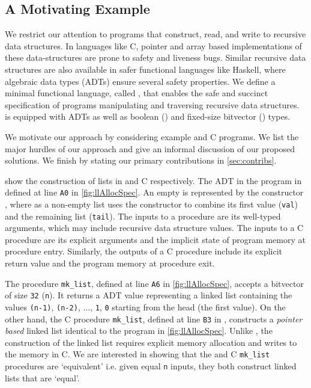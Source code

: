 \subsection{A Motivating Example}
\label{sec:motivatingexample}
We restrict our attention to programs that construct, read, and write
to recursive data structures. In languages like C, pointer and array based
implementations of these data-structures are prone to safety and liveness bugs.
Similar recursive data structures are also available in safer functional languages like Haskell,
where algebraic data types (ADTs) \cite{hope} ensure several safety properties.
We define a minimal functional language, called \SpecL{}, that enables the safe
and succinct specification of programs manipulating and traversing recursive data structures.
\SpecL{} is equipped with ADTs as well as boolean () and fixed-size bitvector () types.

We motivate our approach by considering example \SpecL{} and C programs.
We list the major hurdles of our approach and give an informal discussion of our proposed solutions.
We finish by stating our primary contributions in \cref{sec:contribs}.





 show the construction of lists in \SpecL{} and C respectively.
The  ADT in the \SpecL{} program in defined at line {\tt A0} in \cref{fig:llAllocSpec}.
An empty  is represented by the constructor , where as a non-empty list uses
the  constructor to combine its first value ({\tt val}) and
the remaining list ({\tt tail}).
The inputs to a \SpecL{} procedure are its well-typed arguments, which may include recursive data structure values.
The inputs to a C procedure are its explicit arguments and the implicit state of program memory at procedure entry.
Similarly, the outputs of a C procedure include its explicit return value and the program memory at procedure exit.

The \SpecL{} procedure {\tt mk\_list}, defined at line {\tt A6} in \cref{fig:llAllocSpec}, accepts
a bitvector of size {\tt 32} ({\tt n}).
It returns a  ADT value representing a linked list containing
the values {\tt (n-1)}, {\tt (n-2)}, ..., {\tt 1}, {\tt 0} starting from the head (the first value).
On the other hand, the C procedure {\tt mk\_list}, defined at line {\tt B3} in ,
constructs a {\em pointer based} linked list identical to the \SpecL{} program in \cref{fig:llAllocSpec}.
Unlike \SpecL{}, the construction of the linked list requires explicit memory allocation and writes to
the memory in C.
We are interested in showing that the \SpecL{} and C {\tt mk\_list} procedures are `equivalent'
i.e. given equal {\tt n} inputs, they both construct linked lists that are `equal'.

